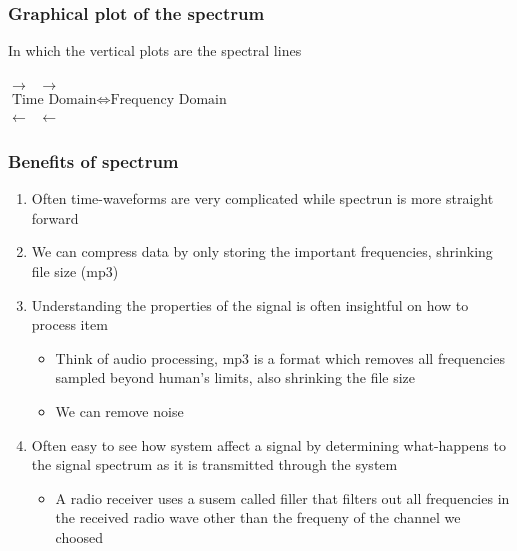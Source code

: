 \documentclass{article}
\begin{document}
    \subsubsection{Graphical plot of the spectrum}
    \begin{center}
    \end{center}
    In which the vertical plots are the spectral lines
    \begin{center}
        $\rightarrow\;$ $\rightarrow$\\
        $\text{Time Domain} \Longleftrightarrow \text{Frequency Domain}$\\
        $\leftarrow$ $\;\leftarrow$
    \end{center}

    \subsubsection{Benefits of spectrum}
    \begin{enumerate}
        \item Often time-waveforms are very complicated while spectrun is more straight forward
        \item We can compress data by only storing the important frequencies, shrinking file size (mp3)
        \item Understanding the properties of the signal is often insightful on how to process item
        \begin{itemize}
            \item Think of audio processing, mp3 is a format which removes all frequencies sampled beyond human's limits, also shrinking the file size
            \item We can remove noise
        \end{itemize}
        \item Often easy to see how system affect a signal by determining what-happens to the signal spectrum as it is transmitted through the system
        \begin{itemize}
            \item A radio receiver uses a susem called filler that filters out all frequencies in the received radio wave other than the frequeny of the channel we choosed
        \end{itemize}
    \end{enumerate}
\end{document}
